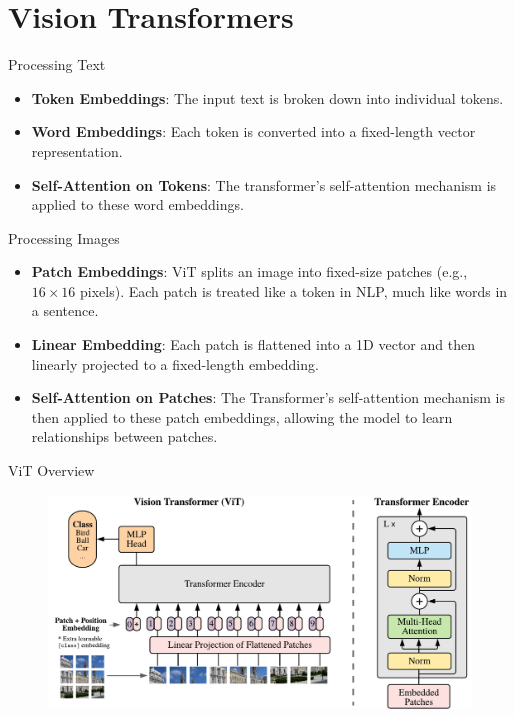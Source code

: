 \section{Vision Transformers}

\begin{frame}{Processing Text}
    \begin{itemize}
        \item \textbf{Token Embeddings}: The input text is broken down into individual tokens. 
	\item \textbf{Word Embeddings}: Each token is converted into a fixed-length vector representation.
	\item \textbf{Self-Attention on Tokens}: The transformer's self-attention mechanism is applied to these word embeddings. 
    \end{itemize}
\end{frame}

\begin{frame}{Processing Images}
    \begin{itemize}
        \item \textbf{Patch Embeddings}: ViT splits an image into fixed-size patches (e.g., $16\times16$ pixels). Each patch is treated like a token in NLP, much like words in a sentence.
	\item \textbf{Linear Embedding}: Each patch is flattened into a 1D vector and then linearly projected to a fixed-length embedding.
	\item \textbf{Self-Attention on Patches}: The Transformer’s self-attention mechanism is then applied to these patch embeddings, allowing the model to learn relationships between patches.
    \end{itemize}
\end{frame}

\begin{frame}{ViT Overview}
    \begin{figure}
        \centering
        \includegraphics[width=0.95\linewidth]{pic/model_scheme}
        \label{fig:vit-figure}
    \end{figure}
\end{frame}



